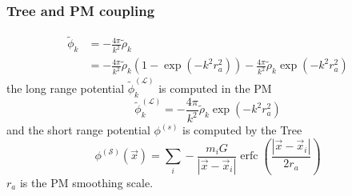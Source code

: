 \documentclass{beamer}
\makeatletter
\newcommand{\mylabel}{%
}
\DeclareMathOperator{\erfc}{erfc}
\makeatother
\begin{document}



\begin{frame}[label=forceaddition1]
    \frametitle{Tree and PM coupling\mylabel}
\begin{align*}
    \tilde\phi_k 
    &= -\frac{4\pi}{k^2} \tilde\rho_k \\
    &= -\frac{4\pi}{k^2} \tilde\rho_k \left( 1 - \exp(-k^2 r_a^2) \right)
       -\frac{4\pi}{k^2} \tilde\rho_k \exp(-k^2 r_a^2)
\end{align*}
the long range potential $\tilde\phi^{(\mathcal{L})}_k$ is computed in the PM
\[
    \tilde\phi^{(\mathcal{L})}_k
    = -\frac{4\pi}{k^2} \tilde\rho_k \exp(-k^2 r_a^2)
\]
and the short range potential $\phi^{(s)}$ is computed by the Tree
\[
    \phi^{(\mathcal{S})}(\vec x)
    = \sum_i - \frac{m_i G}{|\vec x - \vec x_i|} 
        \erfc\left(\frac{|\vec x-\vec x_i|}{2 r_a}\right)
\]
$r_a$ is the PM smoothing scale.
\end{frame}
\end{document}
